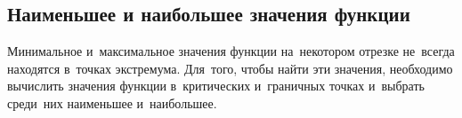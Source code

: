 \subsection{Наименьшее и наибольшее значения функции}
Минимальное и~максимальное значения функции на~некотором отрезке не~всегда находятся в~точках экстремума.
Для~того, чтобы найти эти значения, необходимо вычислить значения функции в~критических и~граничных точках и~выбрать среди~них наименьшее и~наибольшее.